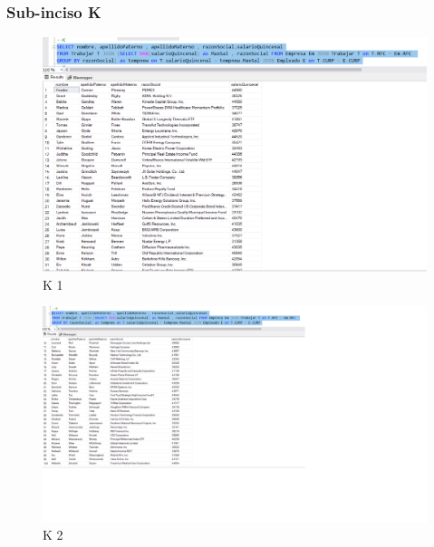 \documentclass[a4paper, 12pt]{report}
\begin{document}
\subsubsection*{Sub-inciso K}
    \begin{figure}
        \includegraphics[width=\textwidth]
            {img/K1.png}\hfill
    \caption{K 1}
    \end{figure}
    \begin{figure}
        \includegraphics[width=\textwidth]
            {img/K2.png}\hfill
    \caption{K 2}
    \end{figure}
\end{document}
